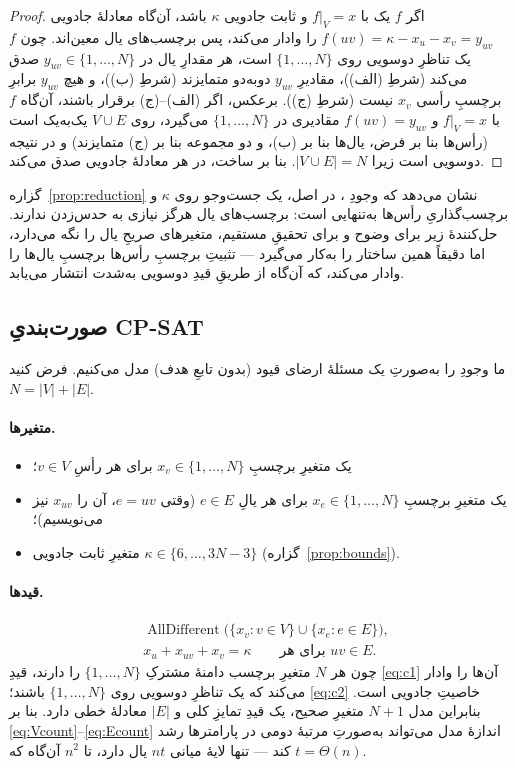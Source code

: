 \documentclass[11pt,a4paper]{article}
\newcommand{\en}[1]{\lr{{\enfont #1}}}
\newcommand{\km}{\kappa}
\DeclareMathOperator{\AllDiff}{AllDifferent}
\theoremstyle{plain}
\theoremstyle{definition}
\theoremstyle{remark}
\begin{document}
\begin{proof}
اگر $f$ یک \en{EMTL} با $f|_V=x$ و ثابت جادویی $\km$ باشد، آن‌گاه معادلهٔ جادویی
$f(uv)=\km-x_u-x_v=y_{uv}$ را وادار می‌کند، پس برچسب‌های یال معین‌اند. چون $f$ یک تناظرِ
دوسویی روی $\{1,\dots,N\}$ است، هر مقدارِ یال در $y_{uv}\in\{1,\dots,N\}$ صدق می‌کند
(شرطِ (الف))، مقادیرِ $y_{uv}$ دوبه‌دو متمایزند (شرطِ (ب))، و هیچ $y_{uv}$ برابرِ برچسبِ
رأسی $x_v$ نیست (شرطِ (ج)). برعکس، اگر
(الف)--(ج) برقرار باشند، آن‌گاه $f$ با $f|_V=x$ و $f(uv)=y_{uv}$ مقادیری در
$\{1,\dots,N\}$ می‌گیرد، روی $V\cup E$ یک‌به‌یک است (رأس‌ها بنا بر فرض، یال‌ها بنا بر
(ب)، و دو مجموعه بنا بر (ج) متمایزند) و در نتیجه دوسویی است زیرا $|V\cup E|=N$. بنا بر
ساخت، در هر معادلهٔ جادویی صدق می‌کند.
\end{proof}

گزاره~\ref{prop:reduction} نشان می‌دهد که وجودِ \en{EMTL}، در اصل، یک جست‌وجو روی $\km$
و برچسب‌گذاریِ رأس‌ها به‌تنهایی است: برچسب‌های یال هرگز نیازی به حدس‌زدن ندارند.
حل‌کنندهٔ زیر برای وضوح و برای تحقیقِ مستقیم، متغیرهای صریحِ یال را نگه می‌دارد، اما
دقیقاً همین ساختار را به‌کار می‌گیرد --- تثبیتِ برچسبِ رأس‌ها برچسبِ یال‌ها را وادار
می‌کند، که آن‌گاه از طریقِ قیدِ دوسویی به‌شدت انتشار می‌یابد.

\subsection{صورت‌بندیِ CP-SAT}

ما وجودِ \en{EMTL} را به‌صورتِ یک مسئلهٔ ارضای قیود (بدون تابعِ هدف) مدل می‌کنیم. فرض
کنید $N=|V|+|E|$.

\paragraph{متغیرها.}
\begin{itemize}[itemsep=1pt]
  \item یک متغیرِ برچسبِ $x_v\in\{1,\dots,N\}$ برای هر رأسِ $v\in V$؛
  \item یک متغیرِ برچسبِ $x_e\in\{1,\dots,N\}$ برای هر یالِ $e\in E$ (وقتی $e=uv$، آن را
        $x_{uv}$ نیز می‌نویسیم)؛
  \item متغیرِ ثابت جادویی $\km\in\{6,\dots,3N-3\}$ (گزاره~\ref{prop:bounds}).
\end{itemize}

\paragraph{قیدها.}
\begin{align}
  &\AllDiff\bigl(\{x_v:v\in V\}\cup\{x_e:e\in E\}\bigr), \tag{C1}\label{eq:c1}\\
  &x_u+x_{uv}+x_v=\km \qquad\text{برای هر } uv\in E. \tag{C2}\label{eq:c2}
\end{align}
چون هر $N$ متغیرِ برچسب دامنهٔ مشترکِ $\{1,\dots,N\}$ را دارند، قیدِ \eqref{eq:c1}
آن‌ها را وادار می‌کند که یک تناظرِ دوسویی روی $\{1,\dots,N\}$ باشند؛ \eqref{eq:c2}
خاصیتِ جادویی است. بنابراین مدل $N+1$ متغیرِ صحیح، یک قیدِ تمایزِ کلی و $|E|$ معادلهٔ
خطی دارد. بنا بر \eqref{eq:Vcount}--\eqref{eq:Ecount} اندازهٔ مدل می‌تواند به‌صورتِ
مرتبهٔ دومی در پارامترها رشد کند --- تنها لایهٔ میانی $nt$ یال دارد، تا $n^2$ آن‌گاه که
$t=\Theta(n)$.
\end{document}
